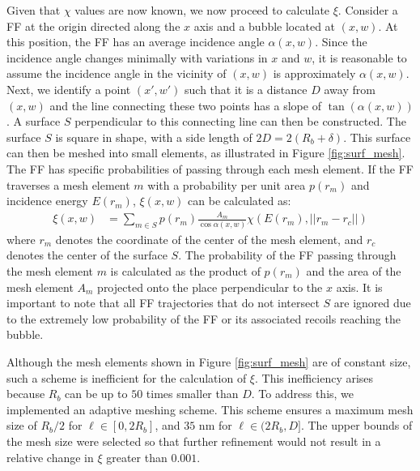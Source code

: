 \documentclass[review]{elsarticle}
\begin{document}
Given that $\chi$ values are now known, we now proceed to calculate $\xi$. Consider a FF at the origin directed along the $x$ axis and a bubble located at $(x, w)$. At this position, the FF has an average incidence angle $\alpha(x, w)$. Since the incidence angle changes minimally with variations in $x$ and $w$, it is reasonable to assume the incidence angle in the vicinity of $(x, w)$ is approximately $\alpha(x, w)$. Next, we identify a point $(x', w')$ such that it is a distance $D$ away from $(x, w)$ and the line connecting these two points has a slope of $\tan (\alpha(x, w))$. A surface $S$ perpendicular to this connecting line can then be constructed. The surface $S$ is square in shape, with a side length of $2D = 2(R_b + \delta)$. This surface can then be meshed into small elements, as illustrated in Figure \ref{fig:surf_mesh}. The FF has specific probabilities of passing through each mesh element. If the FF traverses a mesh element $m$ with a probability per unit area $p(r_m)$ and incidence energy $E(r_m)$, $\xi(x, w)$ can be calculated as:
\begin{align}
	\xi(x, w) &= \sum_{m \in S}
		p(r_m) \frac{A_m}{\cos \alpha(x, w)}
		\chi(E(r_m), ||r_m - r_c||)
	\label{eq:mesh}
\end{align}
where $r_m$ denotes the coordinate of the center of the mesh element, and $r_c$ denotes the center of the surface $S$. The probability of the FF passing through the mesh element $m$ is calculated as the product of $p(r_m)$ and the area of the mesh element $A_m$ projected onto the place perpendicular to the $x$ axis. It is important to note that all FF trajectories that do not intersect $S$ are ignored due to the extremely low probability of the FF or its associated recoils reaching the bubble.

Although the mesh elements shown in Figure \ref{fig:surf_mesh} are of constant size, such a scheme is inefficient for the calculation of $\xi$. This inefficiency arises because $R_b$ can be up to $50$ times smaller than $D$. To address this, we implemented an adaptive meshing scheme. This scheme ensures a maximum mesh size of $R_b / 2$ for $\ell \in [0, 2 R_b]$, and $35$ nm for $\ell \in (2 R_b, D]$. The upper bounds of the mesh size were selected so that further refinement would not result in a relative change in $\xi$ greater than $0.001$.
\end{document}
